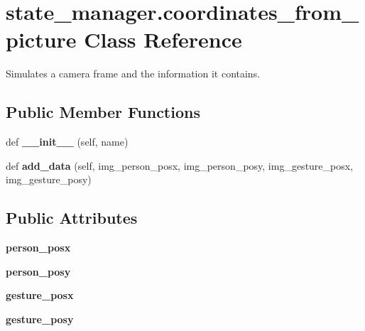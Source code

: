 \hypertarget{classstate__manager_1_1coordinates__from__picture}{}\section{state\+\_\+manager.\+coordinates\+\_\+from\+\_\+picture Class Reference}
\label{classstate__manager_1_1coordinates__from__picture}


Simulates a camera frame and the information it contains.  


\subsection*{Public Member Functions}
\begin{DoxyCompactItemize}
\item 
def {\bfseries \+\_\+\+\_\+init\+\_\+\+\_\+} (self, name)\hypertarget{classstate__manager_1_1coordinates__from__picture_a1cfcda6b1096fe141974378b701b9402}{}\label{classstate__manager_1_1coordinates__from__picture_a1cfcda6b1096fe141974378b701b9402}

\item 
def {\bfseries add\+\_\+data} (self, img\+\_\+person\+\_\+posx, img\+\_\+person\+\_\+posy, img\+\_\+gesture\+\_\+posx, img\+\_\+gesture\+\_\+posy)\hypertarget{classstate__manager_1_1coordinates__from__picture_a480690c0f23cc43b67c9ed8343c41e19}{}\label{classstate__manager_1_1coordinates__from__picture_a480690c0f23cc43b67c9ed8343c41e19}

\end{DoxyCompactItemize}
\subsection*{Public Attributes}
\begin{DoxyCompactItemize}
\item 
{\bfseries person\+\_\+posx}\hypertarget{classstate__manager_1_1coordinates__from__picture_a9c453774ff4cc0644deb040473934bdc}{}\label{classstate__manager_1_1coordinates__from__picture_a9c453774ff4cc0644deb040473934bdc}

\item 
{\bfseries person\+\_\+posy}\hypertarget{classstate__manager_1_1coordinates__from__picture_aabe7e4fb692c99db14d42b6bdd79a656}{}\label{classstate__manager_1_1coordinates__from__picture_aabe7e4fb692c99db14d42b6bdd79a656}

\item 
{\bfseries gesture\+\_\+posx}\hypertarget{classstate__manager_1_1coordinates__from__picture_a945328edc4ceccd3ab9e72b44e785a37}{}\label{classstate__manager_1_1coordinates__from__picture_a945328edc4ceccd3ab9e72b44e785a37}

\item 
{\bfseries gesture\+\_\+posy}\hypertarget{classstate__manager_1_1coordinates__from__picture_a4e1df084f290ebf50ce72a6eff5f938d}{}\label{classstate__manager_1_1coordinates__from__picture_a4e1df084f290ebf50ce72a6eff5f938d}

\end{DoxyCompactItemize}


